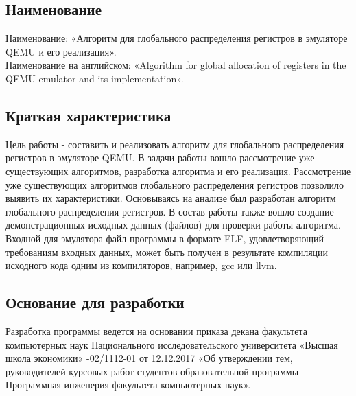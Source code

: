 \subsection{Наименование}
Наименование: «Алгоритм для глобального распределения регистров в эмуляторе QEMU и его реализация». \\
Наименование на английском: «Algorithm for global allocation of registers in the QEMU emulator and its implementation». \\

\subsection{Краткая характеристика}
    Цель работы - составить и реализовать алгоритм для глобального распределения регистров в эмуляторе QEMU.
    В задачи работы вошло рассмотрение уже существующих алгоритмов, разработка алгоритма и его реализация.
    Рассмотрение уже существующих алгоритмов глобального распределения регистров позволило выявить их характеристики. Основываясь на анализе был разработан алгоритм глобального распределения регистров.
    В состав работы также вошло создание демонстрационных исходных данных (файлов) для проверки работы алгоритма. Входной для эмулятора файл программы в формате ELF, удовлетворяющий требованиям входных данных, может быть получен в результате компиляции исходного кода одним из компиляторов, например, gcc или llvm.

\subsection{Основание для разработки}
Разработка программы ведется на основании приказа декана факультета компьютерных наук
Национального исследовательского университета «Высшая школа экономики» 
-02/1112-01 от 12.12.2017
«Об  утверждении  тем,  руководителей  курсовых  работ  студентов
образовательной  программы  Программная  инженерия 
факультета 
компьютерных наук».
